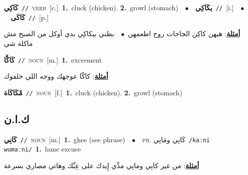 \documentclass[10pt,a4paper,twoside]{article} %
\begin{document}
\begin{multicols}{2}
{{{{\setlength\topsep{0pt}\textbf{\foreignlanguage{arabic}{كَاكِي}}\ {\color{gray}\texttt{//}\color{black}}\ \textsc{verb}\ [c.]\ \textbf{1.}~cluck (chicken).  \textbf{2.}~growl (stomach)\ \ $\bullet$\ \ \setlength\topsep{0pt}\textbf{\foreignlanguage{arabic}{يكَاكِي}}\ {\color{gray}\texttt{//}\color{black}}\ [i.]\ \ $\bullet$\ \ \setlength\topsep{0pt}\textbf{\foreignlanguage{arabic}{كَاكَى}}\ {\color{gray}\texttt{//}\color{black}}\ [p.]\  \begin{flushright}\color{gray}\foreignlanguage{arabic}{\textbf{\underline{\foreignlanguage{arabic}{أمثلة}}}: هيهن كاكِن الجاجات روح اطعمهن\ $\bullet$\ \  بطني بيكاكِي بدي أوكل من الصبح مش ماكلة شي}\end{flushright}\color{black}} \vspace{2mm}

{\setlength\topsep{0pt}\textbf{\foreignlanguage{arabic}{كَاكَّا}}\ {\color{gray}\texttt{//}\color{black}}\ \textsc{noun}\ [m.]\ \textbf{1.}~excrement\  \begin{flushright}\color{gray}\foreignlanguage{arabic}{\textbf{\underline{\foreignlanguage{arabic}{أمثلة}}}: كاكّا عوجهك ووجه اللي خلفوك}\end{flushright}\color{black}} \vspace{2mm}

{\setlength\topsep{0pt}\textbf{\foreignlanguage{arabic}{مْكَاكَاة}}\ {\color{gray}\texttt{//}\color{black}}\ \textsc{noun}\ [f.]\ \textbf{1.}~cluck (chicken).  \textbf{2.}~growl (stomach)\ 

\vspace{-3mm}
\subsection*{\color{blue}\foreignlanguage{arabic}{ك.ا.ن}\color{blue}{ (ntws)}} 

{\setlength\topsep{0pt}\textbf{\foreignlanguage{arabic}{كَانِي}}\ {\color{gray}\texttt{//}\color{black}}\ \textsc{noun}\ [m.]\ \textbf{1.}~ghee (see phrase)\ \ $\bullet$\ \ \textsc{ph.} \color{gray} \foreignlanguage{arabic}{كَانِي ومَانِي}\color{black}\ {\color{gray}\texttt{/{\sffamily kaːni wumaːni}/}\color{black}}\ \textbf{1.}~lame excuse\  \begin{flushright}\color{gray}\foreignlanguage{arabic}{\textbf{\underline{\foreignlanguage{arabic}{أمثلة}}}: من غير كانِي ومانِي مدِّي إِيدك على عِبِّك وهاتي مصاري بسرعة}\end{flushright}\color{black}} \vspace{2mm}

}}}}
\end{multicols}
\end{document}
